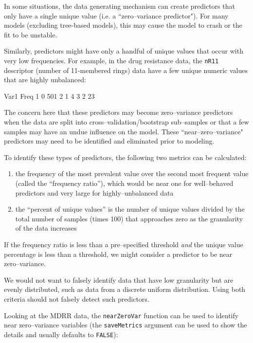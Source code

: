\documentclass[12pt]{article}
\begin{document}
In some situations, the data generating mechanism can create predictors that only have a single unique value (i.e. a ``zero--variance predictor"). For many models (excluding tree-based models), this may cause the model to crash or the fit to be unstable. 

Similarly, predictors might have only a handful of unique values that occur with very low frequencies. For example, in the drug resistance data, the \verb+nR11+ descriptor (number of 11-membered rings) data have a few unique numeric values that are highly unbalanced:
 
\begin{Schunk}
\begin{Soutput}
  Var1 Freq
1    0  501
2    1    4
3    2   23
\end{Soutput}
\end{Schunk}

The concern here that these predictors may become zero--variance predictors when the data are split into cross--validation/bootstrap sub--samples or that a few samples may have an undue influence on the model. These ``near--zero--variance" predictors may need to be identified and eliminated prior to modeling.


To identify these types of predictors, the following two metrics can be calculated:
\begin{enumerate}
   \item the frequency of the most prevalent value over the second most frequent value (called the ``frequency ratio''), which would be near one for well--behaved predictors and very large for highly--unbalanced data
   \item the ``percent of unique values'' is the number of unique values divided by the total number of samples (times 100) that approaches zero as the granularity of the data increases
\end{enumerate}
If the frequency ratio is less than a pre--specified threshold {\em and} the unique value percentage is less than a threshold, we might consider a predictor to be near zero--variance.

We would not want to falsely identify data that have low granularity but are evenly distributed, such as data from a discrete uniform distribution. Using both criteria should not falsely detect such predictors.

Looking at the MDRR data, the \texttt{nearZeroVar} function can be used to identify near zero--variance variables (the \texttt{saveMetrics} argument can be used to show the details and usually defaults to \texttt{FALSE}):
\end{document}
